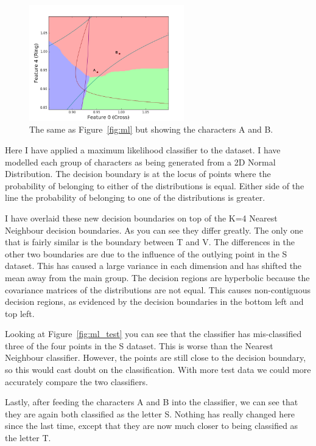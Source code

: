 \documentclass[11pt, a4paper]{article}
\begin{document}
\begin{figure}[ht]
	\centering
	\includegraphics[trim={0 0 0 1cm},clip,width=0.6\textwidth]{max_likelihood_ab.png}
	\caption{The same as Figure~\ref{fig:ml} but showing the characters A and B.}
	\label{fig:ml_ab}
\end{figure}

Here I have applied a maximum likelihood classifier to the dataset. I have modelled each group of characters as being generated from a 2D Normal Distribution. The decision boundary is at the locus of points where the probability of belonging to either of the distributions is equal. Either side of the line the probability of belonging to one of the distributions is greater.

I have overlaid these new decision boundaries on top of the K=4 Nearest Neighbour decision boundaries. As you can see they differ greatly. The only one that is fairly similar is the boundary between T and V. The differences in the other two boundaries are due to the influence of the outlying point in the S dataset. This has caused a large variance in each dimension and has shifted the mean away from the main group. The decision regions are hyperbolic because the covariance matrices of the distributions are not equal. This causes non-contiguous decision regions, as evidenced by the decision boundaries in the bottom left and top left. 

Looking at Figure~\ref{fig:ml_test} you can see that the classifier has mis-classified three of the four points in the S dataset. This is worse than the Nearest Neighbour classifier. However, the points are still close to the decision boundary, so this would cast doubt on the classification. With more test data we could more accurately compare the two classifiers. 

Lastly, after feeding the characters A and B into the classifier, we can see that they are again both classified as the letter S. Nothing has really changed here since the last time, except that they are now much closer to being classified as the letter T. 
\end{document}

